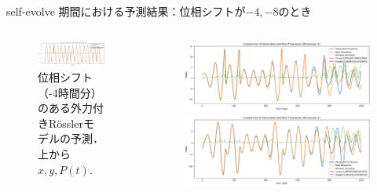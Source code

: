 \begin{frame}{self-evolve 期間における予測結果：位相シフトが$-4, -8$のとき}
\begin{columns}[T]
\begin{column}{.5\textwidth}
\begin{figure}
            \vspace{.5em}
            \begin{minipage}[c][.27\textheight][c]{\linewidth}
              \centering
              \includegraphics[width=0.7\linewidth]{Fig/-4.p.png}
              \caption{\scriptsize{位相シフト（-4時間分）のある外力付きRösslerモデルの予測．上から $x, y, P(t)$. }}
            \end{minipage}
          \end{figure}
      \end{column}
      \begin{column}{.5\textwidth}
        \begin{figure}
          \vspace{-.5cm}
          \begin{minipage}[c][.27\textheight][c]{\linewidth}
            \centering
            \includegraphics[width=0.7\linewidth]{Fig/-8.x.png}
          \end{minipage}
      
          \vspace{-.5em}
  
          \begin{minipage}[c][.27\textheight][c]{\linewidth}
            \centering
            \includegraphics[width=0.7\linewidth]{Fig/-8.y.png}
          \end{minipage}
          

\end{figure}
\end{column}
\end{columns}
\end{frame}
